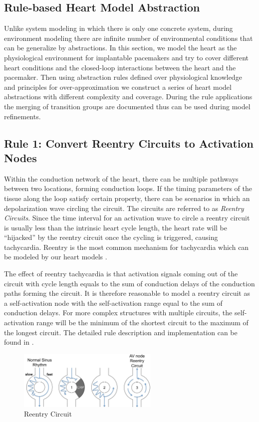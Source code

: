 \subsection{Rule-based Heart Model Abstraction}
\label{ruleBasedHeartModelAbstraction}
Unlike system modeling in which there is only one concrete system, during environment modeling there are infinite number of environmental conditions that can be generalize by abstractions. In this section, we model the heart as the physiological environment for implantable pacemakers and try to cover different heart conditions and the closed-loop interactions between the heart and the pacemaker. Then using abstraction rules defined over physiological knowledge and principles for over-approximation we construct a series of heart model abstractions with different complexity and coverage. During the rule applications the merging of transition groups are documented thus can be used during model refinements.

\subsection{Rule 1: Convert Reentry Circuits to Activation Nodes}
Within the conduction network of the heart, there can be multiple pathways between two locations, forming conduction loops. If the timing parameters of the tissue along the loop satisfy certain property, there can be scenarios in which an depolarization wave circling the circuit. The circuits are referred to as \emph{Reentry Circuits}. Since the time interval for an activation wave to circle a reentry circuit is usually less than the intrinsic heart cycle length, the heart rate will be "`hijacked"' by the reentry circuit once the cycling is triggered, causing tachycardia. Reentry is the most common mechanism for tachycardia which can be modeled by our heart models \cite{vhm_embc10}. 

The effect of reentry tachycardia is that activation signals coming out of the circuit with cycle length equals to the sum of conduction delays of the conduction paths forming the circuit. It is therefore reasonable to model a reentry circuit as a self-activation node with the self-activation range equal to the sum of conduction delays. For more complex structures with multiple circuits, the self-activation range will be the minimum of the shortest circuit to the maximum of the longest circuit. The detailed rule description and implementation can be found in \cite{regar_tech}.
\begin{figure}[!h]
		\centering
		\includegraphics[width=0.6\textwidth]{figs/reentry.pdf}
		\caption{\small Reentry Circuit}
		\label{fig:reentry}
\end{figure}

